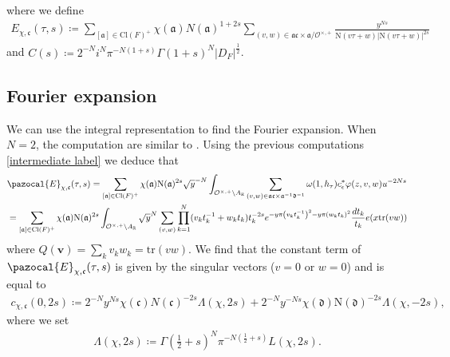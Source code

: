 \documentclass[twoside,a4paper,10pt]{article} %
\newcommand{\8}{\infty}
\newcommand{\vbf}{\mathbf{v}}
\newcommand{\R}{\mathbb{R}}
\newcommand{\afrak}{\mathfrak{a}}
\newcommand{\dfrak}{\mathfrak{d}}
\newcommand{\cfrak}{\mathfrak{c}}
\newcommand{\tr}{\mathrm{tr}}
\newcommand{\N}{\mathrm{N}}
\newcommand{\Ocal}{\mathcal{O}}
\newcommand{\Cl}{\textrm{Cl}}
\newcommand{\Ecal}{\pazocal{E}}
\theoremstyle{mytheoremstyle}
\theoremstyle{remark}
\numberwithin{equation}{section}
\begin{document}
where we define
\begin{align} \label{Eisenstein series one}
E_{\chi,\cfrak}(\tau,s) \coloneqq \sum_{[\afrak] \in \Cl(F)^+}\chi(\afrak) N(\afrak)^{1+2s} \sum_{(v,w) \in \afrak\cfrak \times \afrak /\Ocal^{\times,+}} \frac{y^{Ns}}{\N(v\tau+w) \vert \N(v\tau+w) \vert^{2s}}
\end{align}
and $C(s) \coloneqq 2^{-N}i^N \pi^{-N(1+s)}\Gamma \left ( 1+s \right )^N \vert D_F \vert^\frac{1}{2}$.











\subsection{Fourier expansion}We can use the integral representation to find the Fourier expansion. When $N=2$, the computation are similar to \cite{GKZ87}. Using the previous computations \eqref{intermediate label} we deduce that
\begin{align}
& \Ecal_{\chi,\cfrak}(\tau,s) = \sum_{[\afrak] \in \Cl(F)^+} \chi(\afrak) \N(\afrak)^{2s}  \sqrt{y}^{-N} \int_{\Ocal^{\times,+}\backslash A_\R} \sum_{(v,w) \in \afrak\cfrak \times \afrak^{-1} \dfrak^{-1} } \omega(1,h_\tau)c_\epsilon^\ast  \varphi(z,v,w) u^{-2Ns} \\
& =  \sum_{[\afrak] \in \Cl(F)^+} \chi(\afrak) \N(\afrak)^{2s}\int_{\Ocal^{\times,+}\backslash A_\R} \sqrt{y}^{N} \sum_{(v,w)} \prod_{k=1}^N (v_kt^{-1}_k+w_kt_k)t_k^{-2s} e^{-y\pi \left ( v_kt^{-1}_k \right )^2-y\pi \left (w_kt_k \right )^2} \frac{dt_k}{t_k} e(x \tr(vw))
\end{align}
where $Q(\vbf)=\sum_k v_kw_k=\tr(vw)$. We find that the constant term of $\Ecal_{\chi,\cfrak}(\tau,s)$ is given by the singular vectors ($v=0$ or $w=0$) and is equal to
\begin{align} \label{constant term in s}
c_{\chi,\cfrak}(0,2s) \coloneqq 2^{-N}y^{Ns}\chi(\cfrak)N(\cfrak)^{-2s}\Lambda(\chi,2s)+2^{-N}y^{-Ns}\chi(\dfrak)\N(\dfrak)^{-2s}\Lambda(\chi,-2s),
\end{align}
where we set
\begin{align}
\Lambda(\chi,2s) \coloneqq\Gamma \left (\frac{1}{2}+s \right )^N\pi^{-N\left (\frac{1}{2}+s \right )}L(\chi,2s).
\end{align} 
\end{document}
